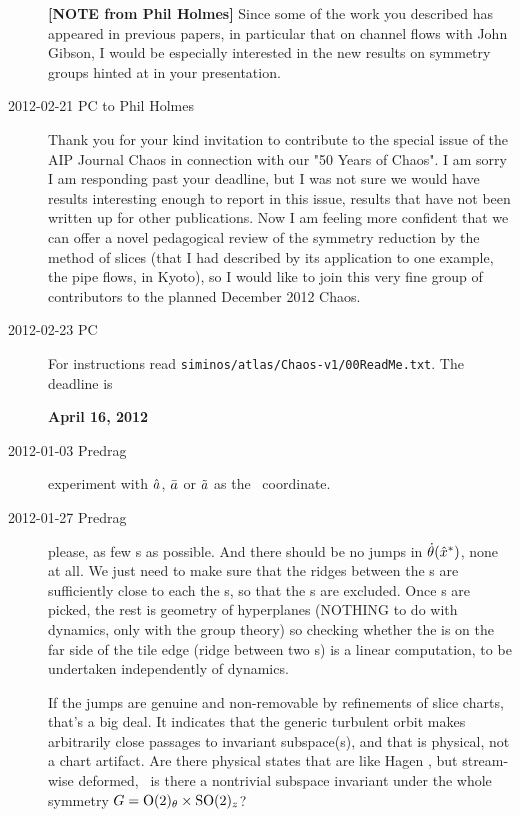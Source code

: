 \begin{description}
\textbf{[NOTE from Phil Holmes]}
Since some of the work you described has appeared in previous papers, in
particular that on channel flows with John Gibson, I would be especially
interested in the new results on symmetry groups hinted at in your
presentation.


\item[2012-02-21 PC to Phil Holmes]
Thank you for your kind invitation to contribute to the special issue of
the AIP Journal Chaos in connection with our "50 Years of Chaos". I am
sorry I am responding past your deadline, but I was not sure we would
have results interesting enough to report in this issue, results that
have not been written up for other publications. Now I am feeling more
confident that we can offer a novel pedagogical review of the symmetry
reduction by the method of slices (that I had described by its
application to one example, the pipe flows, in Kyoto), so I would like to
join this very fine group of contributors to the planned December 2012
Chaos.

\item[2012-02-23 PC] For instructions read
\texttt{siminos/atlas/Chaos-v1/00ReadMe.txt}. The deadline is

\textbf{April 16, 2012}

\item[2012-01-03  Predrag]
    experiment with \ensuremath{\hat{\ssp}}, \ensuremath{\bar{\ssp}} or
    \ensuremath{\tilde{\ssp}} as the \reducedsp\ coordinate.

\item[2012-01-27 Predrag]
    please, as few \template s as possible. And there should be no
    jumps in $\dot{\theta}(\hat{x}^\ast)$, none at all. We just need to
    make sure that the ridges between the \template s are sufficiently
    close to each the \template s, so that the {\chartBord s} are excluded. Once
    \template s are picked, the rest is geometry of hyperplanes (NOTHING to
    do with dynamics, only with the group theory) so checking whether the
    {\chartBord} is on the far side of the tile edge (ridge
    between two \slice s) is a linear computation, to be undertaken
    independently of dynamics.

    If the jumps are genuine and non-removable by refinements of slice
    charts, that's a big deal. It indicates that the generic turbulent
    orbit makes arbitrarily close passages to invariant subspace(s), and
    that is physical, not a chart artifact. Are there physical states
    that are like Hagen \eqv, but stream-wise deformed, \ie\ is there a
    nontrivial subspace invariant under the whole symmetry $G =
    \textrm{O}(2)_\theta \times \textrm{SO}(2)_z$?


\end{description}
